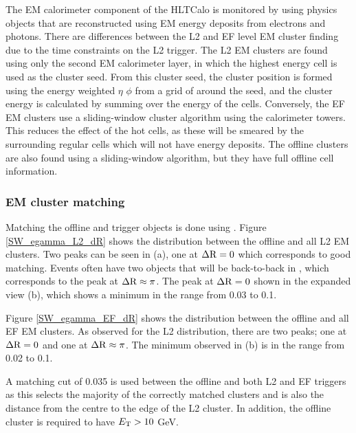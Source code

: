 
The EM calorimeter component of the HLTCalo is monitored by using physics objects that are reconstructed using EM energy deposits from electrons and photons. 
There are differences between the L2 and EF level EM cluster finding due to the time constraints on the L2 trigger.  
The L2 EM clusters are found using only the second EM calorimeter layer, in which the highest energy cell is used as the cluster seed.
From this cluster seed, the cluster position is formed using the energy weighted $\eta$ $\phi$ from a grid of  around the seed, and the cluster energy is calculated by summing over the energy of the cells. 
Conversely, the EF EM clusters use a sliding-window cluster algorithm using the calorimeter towers. 
This reduces the effect of the hot cells, as these will be smeared by the surrounding regular cells which will not have energy deposits.
The offline clusters are also found using a sliding-window algorithm, but they have full offline cell information.
 

\subsubsection{EM cluster matching}

Matching the offline and trigger objects is done using \dr{}.
Figure \ref{SW_egamma_L2_dR} shows the \dr{} distribution between the offline and all L2 EM clusters.
Two peaks can be seen in (a), one at $\mbox{$\Delta{\rm R}$}{}=0$ which corresponds to good matching.
Events often have two objects that will be back-to-back in \dphi{}, which corresponds to the peak at $\mbox{$\Delta{\rm R}$}{}\approx\pi$. 
The peak at $\mbox{$\Delta{\rm R}$}{}=0$ shown in the expanded view (b), which shows a minimum in the range \dr{} from 0.03 to 0.1.

Figure \ref{SW_egamma_EF_dR} shows the \dr{} distribution between the offline and all EF EM clusters.
As observed for the L2 \dr{} distribution, there are two peaks; one at $\mbox{$\Delta{\rm R}$}{}=0$ and one at $\mbox{$\Delta{\rm R}$}{}\approx\pi$. 
The minimum observed in (b) is in the range \dr{} from 0.02 to 0.1.

A \dr{} matching cut of 0.035 is used between the offline and both L2 and EF triggers as this selects the majority of the correctly matched clusters and is also the distance from the centre to the edge of the L2 cluster.
In addition, the offline cluster is required to have $\mbox{$E_{\rm T}$}{}>10$ GeV.  

